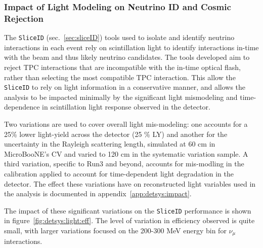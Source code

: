 \subsubsection{Impact of Light Modeling on Neutrino ID and Cosmic Rejection} 
\label{sec:detsys:light}
The \texttt{SliceID} (sec.~\ref{sec:sliceID}) tools used to isolate and identify neutrino interactions in each event rely on scintillation light to identify interactions in-time with the beam and thus likely neutrino candidates. The tools developed aim to reject TPC interactions that are incompatible with the in-time optical flash, rather than selecting the most compatible TPC interaction. This allow the \texttt{SliceID} to rely on light information in a conservative manner, and allows the analysis to be impacted minimally by the significant light mismodeling and time-dependence in scintillation light response observed in the detector. 
\par Two variations are used to cover overall light mis-modeling: one accounts for a 25\% lower light-yield across the detector (25 \% LY) and another for the uncertainty in the Rayleigh scattering length, simulated at 60 cm in MicroBooNE's CV and varied to 120 cm in the systematic variation sample. A third variation, specific to Run3 and beyond, accounts for mis-modling in the calibration applied to account for time-dependent light degradation in the detector. The effect these variations have on reconstructed light variables used in the analysis is documented in appendix~\ref{app:detsys:impact}.

\par The impact of these significant variations on the \texttt{SliceID} performance is shown in figure~\ref{fig:detsys:light:eff}. The level of variation in efficiency observed is quite small, with larger variations focused on the 200-300 MeV energy bin for $\nu_{\mu}$ interactions.


